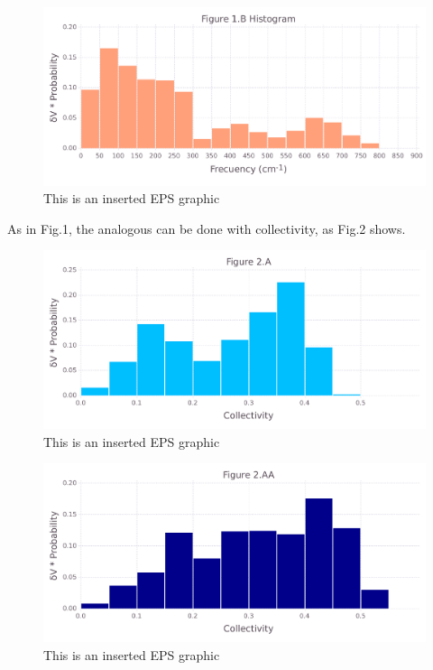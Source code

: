 \documentclass[10pt,letterpaper]{article}
\begin{document}
\begin{figure}[ht]
\begin{center}
\includegraphics[scale=0.5]{1prn/1bfigure.pdf}
\caption{This is an inserted EPS graphic}
\label{fig2}
\end{center}
\end{figure}

\clearpage
As in Fig.1, the analogous can be done with collectivity, as Fig.2 shows.

\begin{figure}[ht]
\begin{center}
\includegraphics[scale=0.5]{1prn/2afigure.pdf}
\caption{This is an inserted EPS graphic}
\label{fig3}
\end{center}
\end{figure}

\begin{figure}[ht]
\begin{center}
\includegraphics[scale=0.5]{1prn/2aafigure.pdf}
\caption{This is an inserted EPS graphic}
\label{fig4}
\end{center}
\end{figure}
\end{document}
